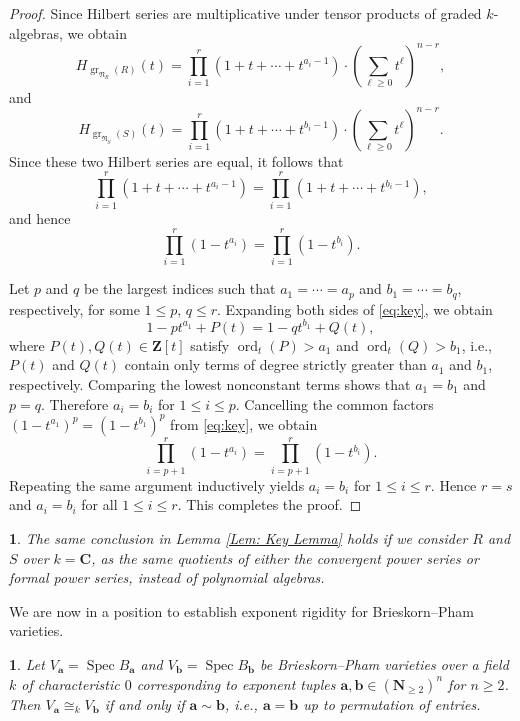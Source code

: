 \documentclass[10pt,a4paper]{amsart}
\numberwithin{equation}{section}
\numberwithin{figure}{section}
\newtheorem{thm}{\protect\theoremname}
\newtheorem{rem}{\protect\remarkname}
\providecommand{\theoremname}{Theorem}
\providecommand{\remarkname}{Remark}
\numberwithin{equation}{section}
\newcommand{\C}{\mathbf{C}}
\newcommand{\N}{\mathbf{N}}
\newcommand{\Z}{\mathbf{Z}}
\newcommand{\ba}{\mathbf{a}}
\newcommand{\bb}{\mathbf{b}}
\newcommand{\Spec}{\operatorname{Spec}}
\begin{document}
\begin{proof}
Since Hilbert series are multiplicative under tensor products of graded $k$-algebras, we obtain
\[
H_{\operatorname{gr}_{\mathfrak{N}_R}(R)}(t)
=
\prod_{i=1}^{r}
(1+t+\cdots+t^{a_i-1})
\cdot
\left(\sum_{\ell\geq 0} t^\ell\right)^{n-r},
\]
and
\[
H_{\operatorname{gr}_{\mathfrak{N}_S}(S)}(t)
=
\prod_{i=1}^{r}
(1+t+\cdots+t^{b_i-1})
\cdot
\left(\sum_{\ell\geq 0} t^\ell\right)^{n-r}.
\]
Since these two Hilbert series are equal, it follows that
\[
\prod_{i=1}^{r}
(1+t+\cdots+t^{a_i-1})
=
\prod_{i=1}^{r}
(1+t+\cdots+t^{b_i-1}),
\]
and hence
\begin{equation}\label{eq:key}
\prod_{i=1}^{r}(1-t^{a_i})
=
\prod_{i=1}^{r}(1-t^{b_i}).
\end{equation}

Let $p$ and $q$ be the largest indices such that $a_1=\cdots=a_p$ and $b_1=\cdots=b_q$, respectively, for some $1\leq p,\, q\leq r$. Expanding both sides of \eqref{eq:key}, we obtain
\begin{equation}\label{eq:key1}
1-pt^{a_1}+P(t)=1-qt^{b_1}+Q(t),
\end{equation}
where \(P(t),Q(t)\in\Z[t]\) satisfy $\operatorname{ord}_t(P)>a_1$ and $\operatorname{ord}_t(Q)>b_1$, i.e., $P(t)$ and $Q(t)$ contain only terms of degree strictly greater than $a_1$ and $b_1$, respectively. Comparing the lowest nonconstant terms shows that $a_1=b_1$ and $p=q$. Therefore $a_i=b_i$ for $1\leq i\leq p$. Cancelling the common factors \((1-t^{a_1})^p=(1-t^{b_1})^p\) from \eqref{eq:key}, we obtain
\begin{equation}\label{eq:key2}
\prod_{i=p+1}^{r}(1-t^{a_i})
=
\prod_{i=p+1}^{r}(1-t^{b_i}).
\end{equation}
Repeating the same argument inductively yields $a_i=b_i$ for $1\leq i\leq r$. Hence $r=s$ and $a_i=b_i$ for all $1\leq i\leq r$. This completes the proof.
\end{proof}

\begin{rem}\label{Rem 1}
    The same conclusion in Lemma \ref{Lem: Key Lemma} holds if we consider $R$ and $S$ over $k=\C$, as the same quotients of either the convergent power series or formal power series, instead of polynomial algebras.
\end{rem}

We are now in a position to establish exponent rigidity for Brieskorn--Pham varieties.

\begin{thm}\label{Thm: Exponent rigidity of B-P variety}
    Let $V_\ba=\Spec B_\ba$ and $V_\bb=\Spec B_\bb$ be Brieskorn--Pham varieties over a field $k$ of characteristic $0$ corresponding to exponent tuples $\ba,\bb\in(\N_{\ge2})^n$ for $n\geq 2$. Then $V_\ba\cong_k V_\bb$ if and only if $\ba\sim \bb$, i.e., $\ba=\bb$ up to permutation of entries.
\end{thm}
\end{document}
